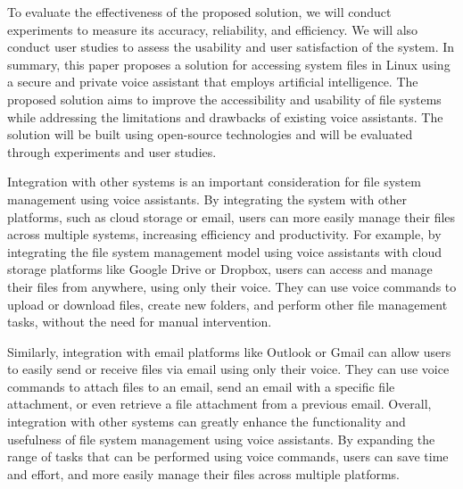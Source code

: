 \documentclass[conference]{IEEEtran}
\begin{document}
\par To evaluate the effectiveness of the proposed solution, we will conduct experiments to measure its accuracy, reliability, and efficiency. We will also conduct user studies to assess the usability and user satisfaction of the system. In summary, this paper proposes a solution for accessing system files in Linux using a secure and private voice assistant that employs artificial intelligence. The proposed solution aims to improve the accessibility and usability of file systems while addressing the limitations and drawbacks of existing voice assistants. The solution will be built using open-source technologies and will be evaluated through experiments and user studies.

\par Integration with other systems is an important consideration for file system management using voice assistants. By integrating the system with other platforms, such as cloud storage or email, users can more easily manage their files across multiple systems, increasing efficiency and productivity. For example, by integrating the file system management model using voice assistants with cloud storage platforms like Google Drive or Dropbox, users can access and manage their files from anywhere, using only their voice. They can use voice commands to upload or download files, create new folders, and perform other file management tasks, without the need for manual intervention.

\par Similarly, integration with email platforms like Outlook or Gmail can allow users to easily send or receive files via email using only their voice. They can use voice commands to attach files to an email, send an email with a specific file attachment, or even retrieve a file attachment from a previous email. Overall, integration with other systems can greatly enhance the functionality and usefulness of file system management using voice assistants. By expanding the range of tasks that can be performed using voice commands, users can save time and effort, and more easily manage their files across multiple platforms.
\end{document}

